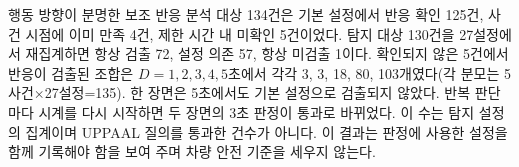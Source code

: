 \begin{revision}


행동 방향이 분명한 보조 반응 분석 대상 134건은 기본 설정에서 반응 확인 125건, 사건 시점에 이미 만족 4건, 제한 시간 내 미확인 5건이었다. 탐지 대상 130건을 27설정에서 재집계하면 항상 검출 72, 설정 의존 57, 항상 미검출 1이다. 확인되지 않은 5건에서 반응이 검출된 조합은 $D=1,2,3,4,5$초에서 각각 3, 3, 18, 80, 103개였다(각 분모는 5사건$\times$27설정=135). 한 장면은 5초에서도 기본 설정으로 검출되지 않았다. 반복 판단마다 시계를 다시 시작하면 두 장면의 3초 판정이 통과로 바뀌었다. 이 수는 탐지 설정의 집계이며 UPPAAL 질의를 통과한 건수가 아니다. 이 결과는 판정에 사용한 설정을 함께 기록해야 함을 보여 주며 차량 안전 기준을 세우지 않는다.
\end{revision}
